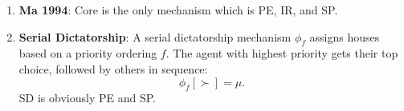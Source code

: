 \documentclass[10pt]{scrartcl}
\newcommand{\vocab}[1]{\textbf{\color{blue} #1}}
\begin{document}
\begin{multicols*}{2}
\begin{enumerate}
        \item \vocab{Ma 1994}: Core is the only mechanism which is PE, IR, and SP.

        \item \vocab{Serial Dictatorship}:
        A serial dictatorship mechanism \( \phi_f \) assigns houses based on a priority ordering \( f \). The agent with highest priority gets their top choice, followed by others in sequence:
        \[
        \phi_f[ \succ ] = \mu.
        \]
        SD is obviously PE and SP.
    \end{enumerate}

\end{multicols*}
\end{document}
